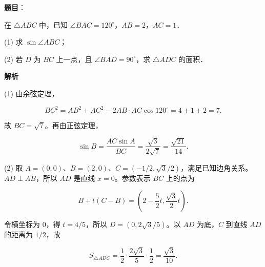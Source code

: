 \begin{answer}

\textbf{题目}：

在 $\triangle ABC$ 中，已知 $\angle BAC=120^\circ$，$AB=2$，$AC=1$．

(1) 求 $\sin\angle ABC$；

(2) 若 $D$ 为 $BC$ 上一点，且 $\angle BAD=90^\circ$，求 $\triangle ADC$ 的面积．

\textbf{解析}


(1) 由余弦定理，

\nopagebreak[4]
\[
BC^2=AB^2+AC^2-2AB\cdot AC\cos120^\circ=4+1+2=7.
\]

故 $BC=\sqrt7$。再由正弦定理，

\nopagebreak[4]
\[
\sin B=\frac{AC\sin A}{BC}=\frac{\sqrt3}{2\sqrt7}=\frac{\sqrt{21}}{14}.
\]


(2) 取 $A=(0,0)$、$B=(2,0)$、$C=(-1/2,\sqrt3/2)$，满足已知边角关系。$AD\perp AB$，所以 $AD$ 是直线 $x=0$。参数表示 $BC$ 上的点为

\nopagebreak[4]
\[
B+t(C-B)=\left(2-\frac52t,\frac{\sqrt3}{2}t\right).
\]

令横坐标为 $0$，得 $t=4/5$，所以 $D=(0,2\sqrt3/5)$。以 $AD$ 为底，$C$ 到直线 $AD$ 的距离为 $1/2$，故

\nopagebreak[4]
\[
S_{\triangle ADC}=\frac12\cdot\frac{2\sqrt3}{5}\cdot\frac12=\frac{\sqrt3}{10}.
\]



\end{answer}
